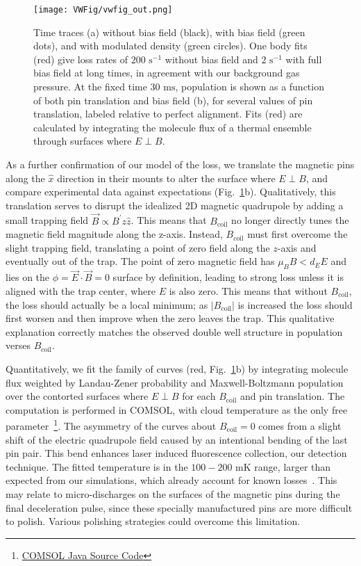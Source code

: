 \documentclass[%
 reprint,
 amsmath,amssymb,
 aps,
prl,
]{revtex4-1}
\newcommand{\bcl}{{$B_\text{coil}$}}
\newcommand{\epb}{{$E\!\perp\!B$}}
\newcommand{\cmnt}[1]{\ignorespaces}
\begin{document}
\begin{figure}[tb]
\texttt{[image: VWFig/vwfig\_out.png]}%
\caption{
Time traces (a) without bias field (black), with bias field (green dots), and with modulated density (green circles). One body fits (red) give loss rates of $200\text{ s}^{-1}$ without bias field and $2\text{ s}^{-1}$ with full bias field at long times, in agreement with our background gas pressure. At the fixed time $30\text{ ms}$, population is shown as a function of both pin translation and bias field (b), for several values of pin translation, labeled relative to perfect alignment. Fits (red) are calculated by integrating the molecule flux of a thermal ensemble through surfaces where \epb.
\label{fig:WVplot}}
\end{figure}


As a further confirmation of our \cmnt{\epb{}  and $\mu_BB<d_EE$} model of the loss, we translate the magnetic pins along the $\hat{x}$ direction in their mounts to alter the surface where \epb{}, and compare experimental data against expectations (Fig.~\ref{fig:WVplot}b). Qualitatively, this translation serves to disrupt the idealized 2D magnetic quadrupole by adding a small trapping field $\vec{B}\propto B^\prime z\hat{z}$. This means that \bcl{} no longer directly tunes the magnetic field magnitude along the z-axis. Instead, \bcl{} must first overcome the slight trapping field, translating a point of zero field along the $z$-axis and eventually out of the trap. The point of zero magnetic field has $\mu_BB<d_EE$ and lies on the $\phi=\vec{E}\cdot\vec{B}=0$ surface by definition, leading to strong loss unless it is aligned with the trap center, where $E$ is also zero. This means that without \bcl{}, the loss should actually be a local minimum; as $|B_\text{coil}|$ is increased the loss should first worsen and then improve when the zero leaves the trap. This qualitative explanation correctly matches the observed double well structure in population verses \bcl.

Quantitatively, we fit the family of curves (red, Fig.~\ref{fig:WVplot}b) by integrating molecule flux weighted by Landau-Zener probability and Maxwell-Boltzmann population over the contorted surfaces where \epb{} for each \bcl{} and pin translation. The computation is performed in COMSOL, with cloud temperature as the only free parameter~\footnote{\href{https://github.com/dreens/spin-flip-integration/}{COMSOL Java Source Code}}. The asymmetry of the curves about $B_\text{coil}=0$ comes from a slight shift of the electric quadrupole field caused by an intentional bending of the last pin pair. This bend enhances laser induced fluorescence collection, our detection technique. The fitted temperature is in the $100-200\text{ mK}$ range, larger than expected from our simulations, which already account for known losses~\cite{Sawyer2008a}. This may relate to micro-discharges on the surfaces of the magnetic pins during the final deceleration pulse, since these specially manufactured pins are more difficult to polish. Various polishing strategies could overcome this limitation.
\end{document}
